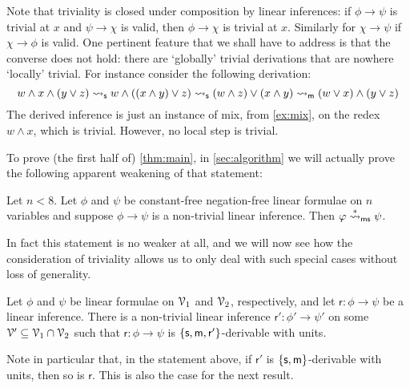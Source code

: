 \documentclass[a4paper, UKenglish, cleveref]{lipics-v2019}
\begin{document}
\begin{remark}
\label{trivial-composition}
Note that triviality is closed under composition by linear inferences: if $\phi \to \psi$ is trivial at $x$ and $\psi \to \chi$ is valid, then $\phi \to \chi$ is trivial at $x$.
Similarly for $\chi \to \psi$ if $\chi \to \phi$ is valid.
One pertinent feature that we shall have to address is that the converse does not hold: there are `globally' trivial derivations that are nowhere `locally' trivial.
For instance consider the following derivation:
\[
w \land x \land (y \lor z)
\rightsquigarrow_{\mathsf{s}}
w \land ((x \land y) \lor z)
\rightsquigarrow_{\mathsf{s}}
(w\land z) \lor (x \land y)
\rightsquigarrow_{\mathsf{m}}
(w\lor x) \land (y \lor z)
\]
The derived inference is just an instance of mix, from \cref{ex:mix}, on the redex $w \land x$, which is trivial.
However, no local step is trivial.
\end{remark}

To prove (the first half of) \cref{thm:main}, in \cref{sec:algorithm} we will actually prove the following apparent weakening of that statement:

\begin{theorem}
  \label{thm:main-reduced}
  Let \(n < 8\). Let \(\phi\) and \(\psi\) be constant-free negation-free linear formulae on \(n\) variables and suppose \(\phi \to \psi\) is a non-trivial linear inference. Then \(\varphi \overset{*}{\rightsquigarrow}_{\mathsf{ms}} \psi\).
\end{theorem}
In fact this statement is no weaker at all, and we will now see how the consideration of triviality allows us to only deal with such special cases without loss of generality.

\begin{proposition}
  \label{prop:trivial}
  Let $\phi$ and $\psi$ be linear formulae on $\mathcal{V}_1$ and $\mathcal{V}_2$, respectively,
  and let \(\mathsf r : \phi \to \psi\) be a linear inference.
  There is a non-trivial linear inference \(\mathsf r' : \phi' \to \psi'\) on some $\mathcal{V}' \subseteq \mathcal{V}_1 \cap \mathcal{V}_2$ such that $\mathsf r : \phi \to \psi$ is $\{\mathsf{s},\mathsf{m},\mathsf r' \}$-derivable with units.
\end{proposition}

Note in particular that, in the statement above, if $\mathsf r'$ is $\{\mathsf{s},\mathsf{m} \}$-derivable with units, then so is $\mathsf r$.
This is also the case for the next result.
\end{document}
